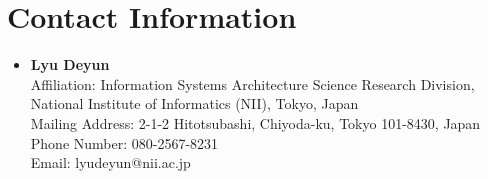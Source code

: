 \documentclass[11pt,a4paper]{moderncv}        %
\renewcommand{\headrulewidth}{0.4pt}       %
\begin{document}
\clearpage
\fancyhf{}
\renewcommand{\headrulewidth}{0.4pt}       %
\fancyhead[R]{\textcolor{gray}{\thepage}}        %

\section{Contact Information}
\begin{itemize}[label={}]
  \item \textbf{{Lyu Deyun}} \\
        Affiliation: Information Systems Architecture Science Research Division, National Institute of Informatics (NII), Tokyo, Japan \\
        Mailing Address: 2-1-2 Hitotsubashi, Chiyoda-ku, Tokyo 101-8430, Japan \\
        Phone Number: 080-2567-8231\\
        Email: lyudeyun@nii.ac.jp
\end{itemize}


\clearpage
\fancyhf{}
\renewcommand{\headrulewidth}{0.4pt}       %
\fancyhead[R]{\textcolor{gray}{\thepage}}        %
\end{document}
